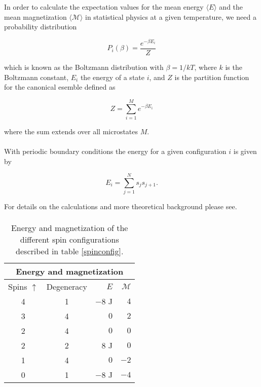 \documentclass[a4paper, fontsize=11pt]{article}
\begin{document}
In order to calculate the expectation values for the mean energy $\langle E \rangle$ and the mean magnetization $\langle \mathcal{M} \rangle$ in statistical physics at a given temperature, we need a probability distribution

\begin{equation}
P_{i}(\beta) = \dfrac{e^{-\beta E_{i}}}{Z}
\end{equation}

which is known as the Boltzmann distribution with $\beta = 1/kT$, where $k$ is the Boltzmann constant, $E_{i}$ the energy of a state $i$, and $Z$ is the partition function for the canonical esemble defined as 

\begin{equation}
Z = \sum^M_{i=1} e^{-\beta E_{i}}
\end{equation}

where the sum extends over all microstates $M$. 

\paragraph{}
With periodic boundary conditions the energy for a given configuration $i$ is given by

\begin{equation}
E_{i} = \sum^N_{j=1} s_{j} s_{j+1}. 
\end{equation}

For details on the calculations and more theoretical background please see. \cite{H-Jensen}

\paragraph{}

\begin{table}[h!]
\centering
\begin{tabular}{|c||c|r|r|}
\toprule
\multicolumn{4}{c}{Energy and magnetization}
\\ \hline
Spins $\uparrow$ & Degeneracy & $E$ & $\mathcal{M}$
\tabularnewline
\hline
4 & 1 & $-8$ J & $4$
\tabularnewline \hline
3 & 4 & $0$ & $2$
\tabularnewline \hline
2 & 4 & $0$  & $0$
\tabularnewline \hline
2 & 2 & $8$ J & $0$
\tabularnewline \hline
1 & 4 & $0$  & $-2$
\tabularnewline \hline
0 & 1 & $-8$ J & $-4$
\tabularnewline \hline
\end{tabular}
\caption{Energy and magnetization of the different spin configurations described in table \ref{spinconfig}.}
\label{EM}
\end{table}
\end{document}
